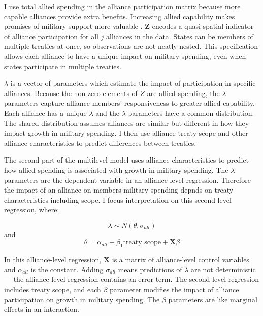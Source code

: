 \documentclass[12pt]{article}
\begin{document}
I use total allied spending in the alliance participation matrix because more capable alliances provide extra benefits.
Increasing allied capability makes promises of military support more valuable \citep{Johnsonetal2015}.  
$\textbf{Z}$ encodes a quasi-spatial indicator of alliance participation for all $j$ alliances in the data. 
States can be members of multiple treaties at once, so observations are not neatly nested. 
This specification allows each alliance to have a unique impact on military spending, even when states participate in multiple treaties. 


$\lambda$ is a vector of parameters which estimate the impact of participation in specific alliances. 
Because the non-zero elements of $Z$ are allied spending, the $\lambda$ parameters capture alliance members' responsiveness to greater allied capability. 
Each alliance has a unique $\lambda$ and the $\lambda$ parameters have a common distribution. 
The shared distribution assumes alliances are similar but different in how they impact growth in military spending. 
I then use alliance treaty scope and other alliance characteristics to predict differences between treaties. 


The second part of the multilevel model uses alliance characteristics to predict how allied spending is associated with growth in military spending. 
The $\lambda$ parameters are the dependent variable in an alliance-level regression.
Therefore the impact of an alliance on members military spending depnds on treaty characteristics including scope. 
I focus interpretation on this second-level regression, where: 

\begin{equation}
\lambda \sim N(\theta, \sigma_{all})
\end{equation} 
and 
\begin{equation}
\theta = \alpha_{all} + \beta_1 \mbox{treaty scope} + \textbf{X} \beta
\end{equation}


In this alliance-level regression, $\textbf{X}$ is a matrix of alliance-level control variables and $\alpha_{all}$ is the constant.
Adding $\sigma_{all}$ means predictions of $\lambda$ are not deterministic--- the alliance level regression contains an error term. 
The second-level regression includes treaty scope, and each $\beta$ parameter modifies the impact of alliance participation on growth in military spending. 
The $\beta$ parameters are like marginal effects in an interaction. 
\end{document}
